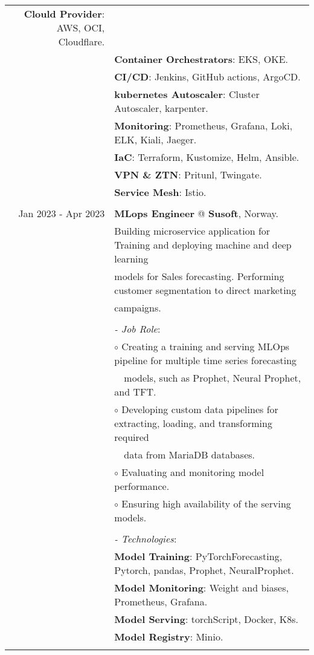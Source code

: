 \documentclass[a4paper,10pt]{article}
\begin{document}
\begin{longtable}{r|l}
    \textbf{Clould Provider}: AWS, OCI, Cloudflare. \\&
    \textbf{Container Orchestrators}: EKS, OKE. \\&
    \textbf{CI/CD}: Jenkins, GitHub actions, ArgoCD. \\&
    \textbf{kubernetes Autoscaler}: Cluster Autoscaler, karpenter. \\&
    \textbf{Monitoring}: Prometheus, Grafana, Loki, ELK, Kiali, Jaeger. \\&
    \textbf{IaC}: Terraform, Kustomize, Helm, Ansible.\\&
    \textbf{VPN \& ZTN}: Pritunl, Twingate. \\&
    \textbf{Service Mesh}: Istio. \\&
    \\
    Jan 2023 - Apr 2023 & \textbf{MLops Engineer} @
    \textbf{Susoft}, Norway. \\& 
    Building microservice application for Training and deploying machine and deep learning \\& models for Sales forecasting. 
    Performing customer segmentation to direct marketing \\& campaigns. \\&
    \\&
    \textit{- Job Role}:\\&
    $\circ$ Creating a training and serving MLOps pipeline for multiple time series 
    forecasting \\& ~~models, such as Prophet, Neural Prophet, and TFT. \\&
    $\circ$ Developing custom data pipelines for extracting, loading, and transforming  
    required \\& ~~data from MariaDB databases. \\&
    $\circ$ Evaluating and monitoring model performance. \\&
    $\circ$ Ensuring high availability of the serving models. \\&
    \\&
    \textit{- Technologies}:\\&
     \textbf{Model Training}: PyTorchForecasting, Pytorch, pandas, Prophet, NeuralProphet. \\&
     \textbf{Model Monitoring}: Weight and biases, Prometheus, Grafana.\\&
     \textbf{Model Serving}: torchScript, Docker, K8s. \\&
     \textbf{Model Registry}: Minio. \\&

\end{longtable}
\end{document}
